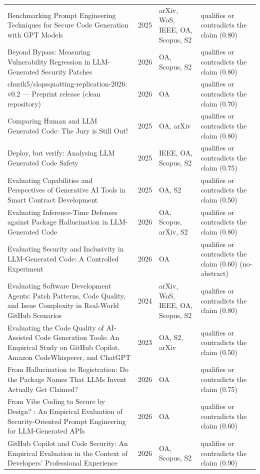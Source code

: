 \begin{longtable}{@{}%
  >{\raggedright\arraybackslash}p{}c%
  >{\raggedright\arraybackslash}p{}%
  >{\raggedright\arraybackslash}p{}@{}}
Benchmarking Prompt Engineering Techniques for Secure Code Generation with GPT Models & 2025 & arXiv, WoS, IEEE, OA, Scopus, S2 & qualifies or contradicts the claim (0.80) \\
Beyond Bypass: Measuring Vulnerability Regression in LLM-Generated Security Patches & 2026 & OA, Scopus, S2 & qualifies or contradicts the claim (0.80) \\
churik5/slopsquatting-replication-2026: v0.2 --- Preprint release (clean repository) & 2026 & OA & qualifies or contradicts the claim (0.70) \\
Comparing Human and LLM Generated Code: The Jury is Still Out! & 2025 & OA, arXiv & qualifies or contradicts the claim (0.80) \\
Deploy, but verify: Analysing LLM Generated Code Safety & 2025 & IEEE, OA, Scopus, S2 & qualifies or contradicts the claim (0.75) \\
Evaluating Capabilities and Perspectives of Generative AI Tools in Smart Contract Development & 2025 & OA, S2 & qualifies or contradicts the claim (0.50) \\
Evaluating Inference-Time Defenses against Package Hallucination in LLM-Generated Code & 2026 & OA, Scopus, arXiv, S2 & qualifies or contradicts the claim (0.80) \\
Evaluating Security and Inclusivity in LLM-Generated Code: A Controlled Experiment & 2026 & OA & qualifies or contradicts the claim (0.60) (no-abstract) \\
Evaluating Software Development Agents: Patch Patterns, Code Quality, and Issue Complexity in Real-World GitHub Scenarios & 2024 & arXiv, WoS, IEEE, OA, Scopus, S2 & qualifies or contradicts the claim (0.80) \\
Evaluating the Code Quality of AI-Assisted Code Generation Tools: An Empirical Study on GitHub Copilot, Amazon CodeWhisperer, and ChatGPT & 2023 & OA, S2, arXiv & qualifies or contradicts the claim (0.50) \\
From Hallucination to Registration: Do the Package Names That LLMs Invent Actually Get Claimed? & 2026 & OA & qualifies or contradicts the claim (0.75) \\
From Vibe Coding to Secure by Design? : An Empirical Evaluation of Security-Oriented Prompt Engineering for LLM-Generated APIs & 2026 & OA & qualifies or contradicts the claim (0.60) \\
GitHub Copilot and Code Security: An Empirical Evaluation in the Context of Developers' Professional Experience & 2026 & OA, Scopus, S2 & qualifies or contradicts the claim (0.90) \\

\end{longtable}
